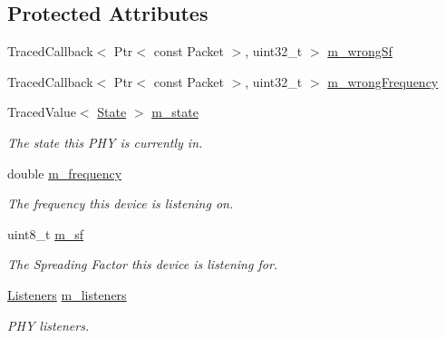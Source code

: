\subsection*{Protected Attributes}
\begin{DoxyCompactItemize}
\item 
Traced\+Callback$<$ Ptr$<$ const Packet $>$, uint32\+\_\+t $>$ \hyperlink{classns3_1_1lorawan_1_1EndDeviceLoraPhy_ac3e0c1c101ab697a724622598ae208fa}{m\+\_\+wrong\+Sf}
\item 
Traced\+Callback$<$ Ptr$<$ const Packet $>$, uint32\+\_\+t $>$ \hyperlink{classns3_1_1lorawan_1_1EndDeviceLoraPhy_af8a4589c87ef5198d5a940d081959d62}{m\+\_\+wrong\+Frequency}
\item 
\mbox{\label{classns3_1_1lorawan_1_1EndDeviceLoraPhy_ac16db644f498ae360fe7f50b5344a33c}} 
Traced\+Value$<$ \hyperlink{classns3_1_1lorawan_1_1EndDeviceLoraPhy_adc84e4ce7796e19f19f077df9592af15}{State} $>$ \hyperlink{classns3_1_1lorawan_1_1EndDeviceLoraPhy_ac16db644f498ae360fe7f50b5344a33c}{m\+\_\+state}
\begin{DoxyCompactList}\small\item\em The state this P\+HY is currently in. \end{DoxyCompactList}\item 
\mbox{\label{classns3_1_1lorawan_1_1EndDeviceLoraPhy_aeec9a9ac928a32278a8006d7e7dc2a0f}} 
double \hyperlink{classns3_1_1lorawan_1_1EndDeviceLoraPhy_aeec9a9ac928a32278a8006d7e7dc2a0f}{m\+\_\+frequency}
\begin{DoxyCompactList}\small\item\em The frequency this device is listening on. \end{DoxyCompactList}\item 
\mbox{\label{classns3_1_1lorawan_1_1EndDeviceLoraPhy_a83f682dc75f0c356d2cc7b57dd0fd991}} 
uint8\+\_\+t \hyperlink{classns3_1_1lorawan_1_1EndDeviceLoraPhy_a83f682dc75f0c356d2cc7b57dd0fd991}{m\+\_\+sf}
\begin{DoxyCompactList}\small\item\em The Spreading Factor this device is listening for. \end{DoxyCompactList}\item 
\mbox{\label{classns3_1_1lorawan_1_1EndDeviceLoraPhy_a7953385bd2f8b872aeddf9d7dd8d47d4}} 
\hyperlink{classns3_1_1lorawan_1_1EndDeviceLoraPhy_a2d6703f5ff4138f1a45afd26ec6223d9}{Listeners} \hyperlink{classns3_1_1lorawan_1_1EndDeviceLoraPhy_a7953385bd2f8b872aeddf9d7dd8d47d4}{m\+\_\+listeners}
\begin{DoxyCompactList}\small\item\em P\+HY listeners. \end{DoxyCompactList}\end{DoxyCompactItemize}


